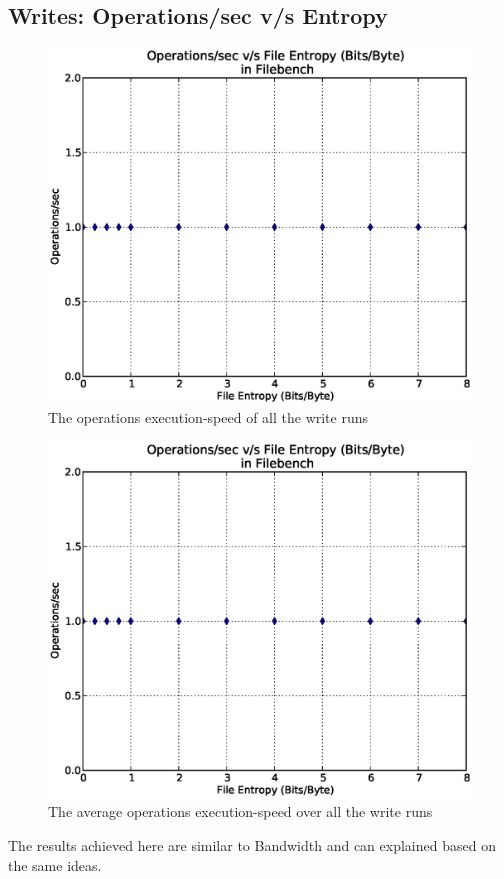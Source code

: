 \subsection{Writes: Operations/sec v/s Entropy}
\begin{figure}[H]
\begin{center}
\includegraphics[scale=.55]{../results/set2/write_ops_2.eps}
\caption{The operations execution-speed of all the write runs}
\label{fig:wops2}
\end{center}
\end{figure}


\begin{figure}[H]
\begin{center}
\includegraphics[scale=.55]{../results/set2/write_ops_2.eps}
\caption{The average operations execution-speed over all the write runs}
\label{fig:wopsavg2}
\end{center}
\end{figure}
The results achieved here are similar to Bandwidth and can explained based on the same ideas.

